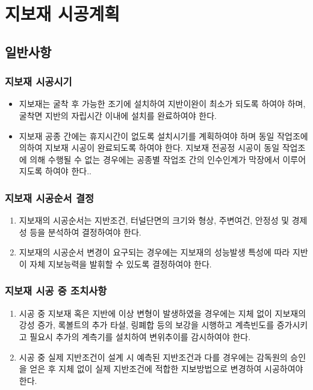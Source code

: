 

\newpage
\section[지보재 시공계획]{지보재 시공계획}

%
%
%


\subsection{일반사항}

\subsubsection{지보재 시공시기}
\begin{itemize}
\item 지보재는 굴착 후 가능한 조기에 설치하여 지반이완이 최소가 되도록 하여야 하며, 굴착면 지반의 자립시간 이내에 설치를 완료하여야 한다.
\item 지보재 공종 간에는 휴지시간이 없도록 설치시기를 계획하여야 하며 동일 작업조에 의하여 지보재 시공이 완료되도록 하여야 한다. 지보재 전공정 시공이 동일 작업조에 의해 수행될 수 없는 경우에는 공종별 작업조 간의 인수인계가 막장에서 이루어지도록 하여야 한다..
\end{itemize}


\subsubsection{지보재 시공순서 결정}
\begin{enumerate}
\item 지보재의 시공순서는 지반조건, 터널단면의 크기와 형상, 주변여건, 안정성 및 경제성 등을 분석하여 결정하여야 한다.
\item 지보재의 시공순서 변경이 요구되는 경우에는 지보재의 성능발생 특성에 따라 지반이 자체 지보능력을 발휘할 수 있도록 결정하여야 한다.  
\end{enumerate}

\subsubsection{지보재 시공 중 조치사항}
\begin{enumerate}
\item  시공 중 지보재 혹은 지반에 이상 변형이 발생하였을 경우에는 지체 없이 지보재의 강성 증가, 록볼트의 추가 타설, 링폐합 등의 보강을 시행하고 계측빈도를 증가시키고 필요시 추가의 계측기를 설치하여 변위추이를 감시하여야 한다.  
\item  시공 중 실제 지반조건이 설계 시 예측된 지반조건과 다를 경우에는 감독원의 승인을 얻은 후 지체 없이 실제 지반조건에 적합한 지보방법으로 변경하여 시공하여야 한다.  
\end{enumerate}

